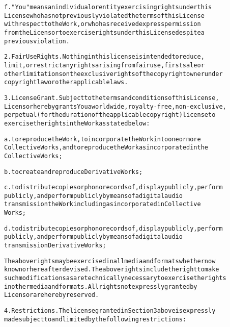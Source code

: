 \documentclass{report}
\begin{document}
\begin{alltt}
f. "You" means an individual or entity exercising rights under this
   License who has not previously violated the terms of this License
   with respect to the Work, or who has received express permission
   from the Licensor to exercise rights under this License despite a
   previous violation.

2. Fair Use Rights. Nothing in this license is intended to reduce,
limit, or restrict any rights arising from fair use, first sale or
other limitations on the exclusive rights of the copyright owner under
copyright law or other applicable laws.

3. License Grant. Subject to the terms and conditions of this License,
Licensor hereby grants You a worldwide, royalty-free, non-exclusive,
perpetual (for the duration of the applicable copyright) license to
exercise the rights in the Work as stated below:

a. to reproduce the Work, to incorporate the Work into one or more
   Collective Works, and to reproduce the Work as incorporated in the
   Collective Works;

b. to create and reproduce Derivative Works;

c. to distribute copies or phonorecords of, display publicly, perform
   publicly, and perform publicly by means of a digital audio
   transmission the Work including as incorporated in Collective
   Works;

d. to distribute copies or phonorecords of, display publicly, perform
   publicly, and perform publicly by means of a digital audio
   transmission Derivative Works;

The above rights may be exercised in all media and formats whether now
known or hereafter devised. The above rights include the right to make
such modifications as are technically necessary to exercise the rights
in other media and formats. All rights not expressly granted by
Licensor are hereby reserved.

4. Restrictions. The license granted in Section 3 above is expressly
made subject to and limited by the following restrictions:


\end{alltt}
\end{document}

